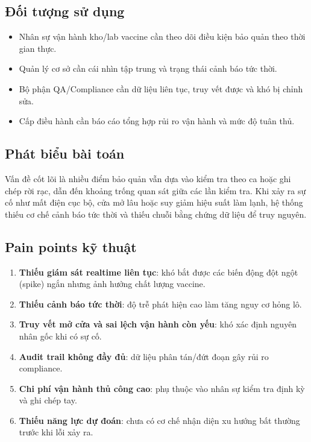 \documentclass[12pt,a4paper]{report}
\begin{document}
\subsection{Đối tượng sử dụng}
\begin{itemize}[leftmargin=1.5em]
    \item Nhân sự vận hành kho/lab vaccine cần theo dõi điều kiện bảo quản theo thời gian thực.
    \item Quản lý cơ sở cần cái nhìn tập trung và trạng thái cảnh báo tức thời.
    \item Bộ phận QA/Compliance cần dữ liệu liên tục, truy vết được và khó bị chỉnh sửa.
    \item Cấp điều hành cần báo cáo tổng hợp rủi ro vận hành và mức độ tuân thủ.
\end{itemize}

\subsection{Phát biểu bài toán}
Vấn đề cốt lõi là nhiều điểm bảo quản vẫn dựa vào kiểm tra theo ca hoặc ghi chép rời rạc, dẫn đến khoảng trống quan sát giữa các lần kiểm tra. Khi xảy ra sự cố như mất điện cục bộ, cửa mở lâu hoặc suy giảm hiệu suất làm lạnh, hệ thống thiếu cơ chế cảnh báo tức thời và thiếu chuỗi bằng chứng dữ liệu để truy nguyên.

\subsection{Pain points kỹ thuật}
\begin{enumerate}[leftmargin=1.7em]
    \item \textbf{Thiếu giám sát realtime liên tục}: khó bắt được các biến động đột ngột (spike) ngắn nhưng ảnh hưởng chất lượng vaccine.
    \item \textbf{Thiếu cảnh báo tức thời}: độ trễ phát hiện cao làm tăng nguy cơ hỏng lô.
    \item \textbf{Truy vết mở cửa và sai lệch vận hành còn yếu}: khó xác định nguyên nhân gốc khi có sự cố.
    \item \textbf{Audit trail không đầy đủ}: dữ liệu phân tán/đứt đoạn gây rủi ro compliance.
    \item \textbf{Chi phí vận hành thủ công cao}: phụ thuộc vào nhân sự kiểm tra định kỳ và ghi chép tay.
    \item \textbf{Thiếu năng lực dự đoán}: chưa có cơ chế nhận diện xu hướng bất thường trước khi lỗi xảy ra.
\end{enumerate}
\end{document}

